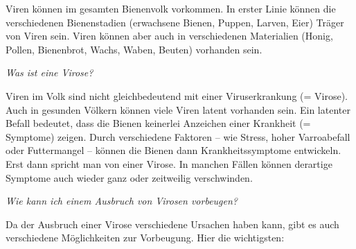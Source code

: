 Viren können im gesamten Bienenvolk vorkommen. In erster Linie können die verschiedenen Bienenstadien (erwachsene Bienen, Puppen, Larven, Eier) Träger von Viren sein. Viren können aber auch in verschiedenen Materialien (Honig, Pollen, Bienenbrot, Wachs, Waben, Beuten) vorhanden sein.

\textit{Was ist eine Virose?}

Viren im Volk sind nicht gleichbedeutend mit einer Viruserkrankung (= Virose). Auch in gesunden Völkern können viele Viren latent vorhanden sein. Ein latenter Befall bedeutet, dass die Bienen keinerlei Anzeichen einer Krankheit (= Symptome) zeigen. Durch verschiedene Faktoren – wie Stress, hoher Varroabefall oder Futtermangel – können die Bienen dann Krankheitssymptome entwickeln. Erst dann spricht man von einer Virose. In manchen Fällen können derartige Symptome auch wieder ganz oder zeitweilig verschwinden.

\textit{Wie kann ich einem Ausbruch von Virosen vorbeugen?}

Da der Ausbruch einer Virose verschiedene Ursachen haben kann, gibt es auch verschiedene Möglichkeiten zur Vorbeugung. Hier die wichtigsten:


